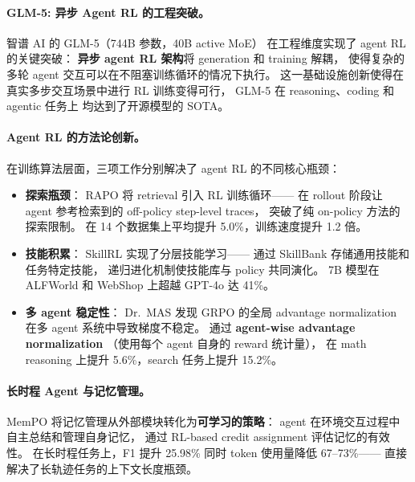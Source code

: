 
\paragraph{GLM-5: 异步 Agent RL 的工程突破。}
智谱 AI 的 GLM-5（744B 参数，40B active MoE）
在工程维度实现了 agent RL 的关键突破：
\textbf{异步 agent RL 架构}将 generation 和 training 解耦，
使得复杂的多轮 agent 交互可以在不阻塞训练循环的情况下执行。
这一基础设施创新使得在真实多步交互场景中进行 RL 训练变得可行，
GLM-5 在 reasoning、coding 和 agentic 任务上
均达到了开源模型的 SOTA。

\paragraph{Agent RL 的方法论创新。}
在训练算法层面，三项工作分别解决了 agent RL 的不同核心瓶颈：

\begin{itemize}[leftmargin=2em]
  \item \textbf{探索瓶颈}：
    RAPO \cite{zhang2026rapo} 将 retrieval 引入 RL 训练循环——
    在 rollout 阶段让 agent 参考检索到的 off-policy step-level traces，
    突破了纯 on-policy 方法的探索限制。
    在 14 个数据集上平均提升 5.0\%，训练速度提升 1.2 倍。

  \item \textbf{技能积累}：
    SkillRL \cite{xia2026skillrl} 实现了分层技能学习——
    通过 SkillBank 存储通用技能和任务特定技能，
    递归进化机制使技能库与 policy 共同演化。
    7B 模型在 ALFWorld 和 WebShop 上超越 GPT-4o 达 41\%。

  \item \textbf{多 agent 稳定性}：
    Dr.\ MAS \cite{feng2026drmas} 发现 GRPO 的全局 advantage normalization
    在多 agent 系统中导致梯度不稳定。
    通过 \textbf{agent-wise advantage normalization}
    （使用每个 agent 自身的 reward 统计量），
    在 math reasoning 上提升 5.6\%，search 任务上提升 15.2\%。
\end{itemize}

\paragraph{长时程 Agent 与记忆管理。}
MemPO \cite{li2026mempo} 将记忆管理从外部模块转化为\textbf{可学习的策略}：
agent 在环境交互过程中自主总结和管理自身记忆，
通过 RL-based credit assignment 评估记忆的有效性。
在长时程任务上，F1 提升 25.98\%
同时 token 使用量降低 67--73\%——
直接解决了长轨迹任务的上下文长度瓶颈。

